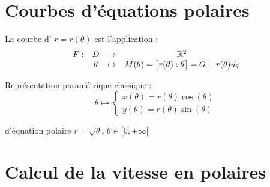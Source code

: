 



\section{Courbes d'équations polaires}

\begin{frame}

La courbe d' $r=r(\theta)$ 
est l'application  :
$$\begin{array}{cccc}
F :&D&\rightarrow&\mathbb{R}^2\\
 &\theta&\mapsto&M(\theta) = \big[r(\theta):\theta\big] = O+r(\theta)\vec{u}_\theta
\end{array}
$$

\pause


\pause

Représentation paramétrique classique : 
$$\theta\mapsto\left\{
\begin{array}{l}
x(\theta)=r(\theta)\cos(\theta)\\
y(\theta)=r(\theta)\sin(\theta)
\end{array}
\right.$$

\end{frame}


\begin{frame}

 d'équation polaire $r = \sqrt{\theta}$, \quad $\theta \in [0,+\infty[$




\end{frame}



\section{Calcul de la vitesse en polaires}

